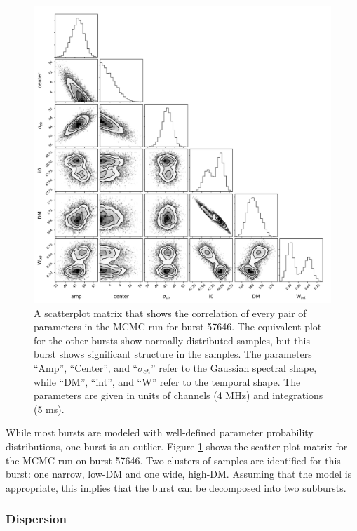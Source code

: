 \documentclass[twocolumn]{aastex61}
\begin{document}

\begin{figure}[htb]
\begin{center}
\includegraphics[width=2\columnwidth]{corner57646}
\caption{A scatterplot matrix that shows the correlation of every pair of parameters in the MCMC run for burst 57646. The equivalent plot for the other bursts show normally-distributed samples, but this burst shows significant structure in the samples. The parameters ``Amp'', ``Center'', and ``$\sigma_{ch}$'' refer to the Gaussian spectral shape, while ``DM'', ``int'', and ``W'' refer to the temporal shape. The parameters are given in units of channels (4 MHz) and integrations (5 ms).
\label{fig:corner}}
\end{center}
\end{figure}

While most bursts are modeled with well-defined parameter probability distributions, one burst is an outlier. Figure \ref{fig:corner} shows the scatter plot matrix \citep{corner} for the MCMC run on burst 57646. Two clusters of samples are identified for this burst: one narrow, low-DM and one wide, high-DM. Assuming that the model is appropriate, this implies that the burst can be decomposed into two subbursts.

\subsubsection{Dispersion}
\end{document}
